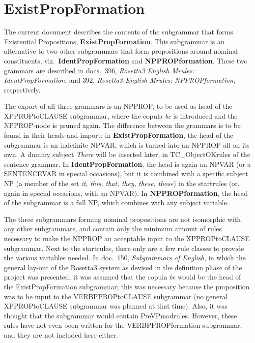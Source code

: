 
   \RosDate{\today}
   \RosSupersedes{-}
   \MakeRosTitle
%
%

\section{ExistPropFormation}
The current document describes the contents of 
the subgrammar that forms Existential Propositions, {\bf ExistPropFormation}.
This subgrammar is an alternative to two other subgrammars that form 
propositions around nominal constituents, viz.\ {\bf IdentPropFormation} and {
\bf NPPROPformation}. These two grammars are described in docs.\ 396, {\em 
Rosetta3 English Mrules: IdentPropFormation\/}, and 392, {\em Rosetta3 English 
Mrules: NPPROPformation\/}, respectively. 

The export of all three grammars is 
an NPPROP, to be used as head of the XPPROPtoCLAUSE subgrammar, where the 
copula {\em be\/} is introduced and the NPPROP-node is pruned again. 
The difference between the grammars is to be 
found in their heads and import: in {\bf ExistPropFormation}, the head of the 
subgrammar is an indefinite NPVAR, which is turned into an NPPROP all 
on its own.
A dummy subject {\em There\/} will be inserted later, in TC\_ObjectOKrules of 
the sentence grammar. In {\bf IdentPropFormation}, the head is again an NPVAR 
(or a SENTENCEVAR in special occasions), but it is combined with a specific 
subject NP (a member of the set {\em it, this, that, they, these, those\/}) in 
the startrules (or, again in special occasions, with an NPVAR). 
In {\bf NPPROPformation\/}, the head of the subgrammar is a 
full NP, which combines with any subject variable.

The three subgrammars forming nominal propositions are not isomorphic with any 
other subgrammars, and contain only the minimum amount of rules necessary 
to make the 
NPPROP an acceptable input to the XPPROPtoCLAUSE subgrammar. Next to the 
startrules, there only are a few rule classes to provide the various variables 
needed. In doc.\ 150, {\em Subgrammars of English\/}, in which the general 
lay-out of the Rosetta3 system as devised in the definition phase of the 
project was presented, it was assumed that the copula {\em be\/} would be 
the head of the ExistPropFormation subgrammar; this was necessary 
because the proposition was to be input to the VERBPPROPtoCLAUSE subgrammar
(no general XPPROPtoCLAUSE subgrammar was planned at that time). Also, it was 
thought that the subgrammar would contain PreVPmodrules. However, these rules 
have not even been written for the VERBPPROPformation subgrammar, and they are 
not included here either.

